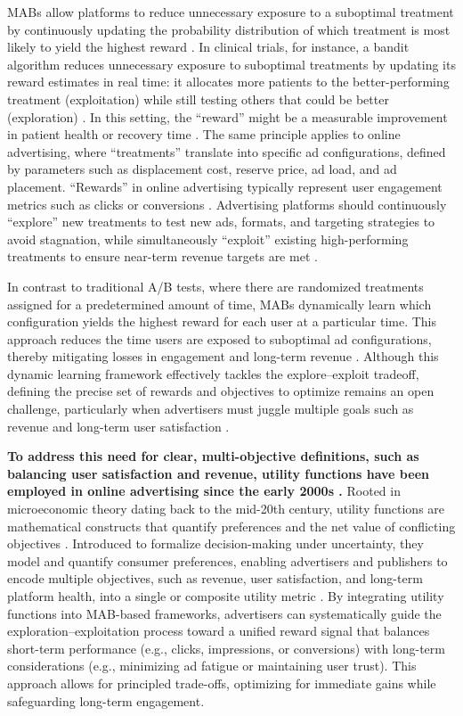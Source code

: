 \documentclass[final]{anthology-ch}         %
\begin{document}
MABs allow platforms to reduce unnecessary exposure to a suboptimal treatment by continuously updating the probability distribution of which treatment is most likely to yield the highest reward \cite{kuleshov2014algorithms}. In clinical trials, for instance, a bandit algorithm reduces unnecessary exposure to suboptimal treatments by updating its reward estimates in real time: it allocates more patients to the better-performing treatment (exploitation) while still testing others that could be better (exploration) \cite{kuleshov2014algorithms}\cite{villar2015multi}. In this setting, the “reward” might be a measurable improvement in patient health or recovery time \cite{villar2015multi}. The same principle applies to online advertising, where “treatments” translate into specific ad configurations, defined by parameters such as displacement cost, reserve price, ad load, and ad placement. “Rewards” in online advertising typically represent user engagement metrics such as clicks or conversions \cite{schwartz2017customer}. Advertising platforms should continuously “explore” new treatments to test new ads, formats, and targeting strategies to avoid stagnation, while simultaneously “exploit” existing high-performing treatments to ensure near-term revenue targets are met \cite{schwartz2017customer}.  

In contrast to traditional A/B tests, where there are randomized treatments assigned for a predetermined amount of time, MABs dynamically learn which configuration yields the highest reward for each user at a particular time. This approach reduces the time users are exposed to suboptimal ad configurations, thereby mitigating losses in engagement and long-term revenue \cite{schwartz2017customer}. Although this dynamic learning framework effectively tackles the explore–exploit tradeoff, defining the precise set of rewards and objectives to optimize remains an open challenge, particularly when advertisers must juggle multiple goals such as revenue and long-term user satisfaction \cite{wen2019learning}.

\textbf{To address this need for clear, multi-objective definitions, such as balancing user satisfaction and revenue, utility functions have been employed in online advertising since the early 2000s \cite{engel2008incorporating}.} Rooted in microeconomic theory dating back to the mid-20th century, utility functions are mathematical constructs that quantify preferences and the net value of conflicting objectives \cite{Stigler1950} \cite{vonNeumannMorgenstern1944}. Introduced to formalize decision-making under uncertainty, they model and quantify consumer preferences, enabling advertisers and publishers to encode multiple objectives, such as revenue, user satisfaction, and long-term platform health, into a single or composite utility metric \cite{engel2008incorporating}. By integrating utility functions into MAB-based frameworks, advertisers can systematically guide the exploration–exploitation process toward a unified reward signal that balances short-term performance (e.g., clicks, impressions, or conversions) with long-term considerations (e.g., minimizing ad fatigue or maintaining user trust). This approach allows for principled trade-offs, optimizing for immediate gains while safeguarding long-term engagement.
\end{document}
